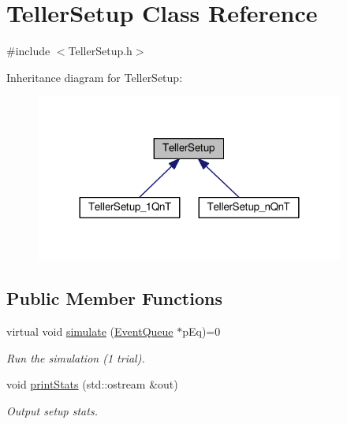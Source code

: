 \hypertarget{class_teller_setup}{}\section{Teller\+Setup Class Reference}
\label{class_teller_setup}


{\ttfamily \#include $<$Teller\+Setup.\+h$>$}



Inheritance diagram for Teller\+Setup\+:
\nopagebreak
\begin{figure}[H]
\begin{center}
\leavevmode
\includegraphics[width=288pt]{class_teller_setup__inherit__graph}
\end{center}
\end{figure}
\subsection*{Public Member Functions}
\begin{DoxyCompactItemize}
\item 
virtual void \hyperlink{class_teller_setup_a2050cd6f277e76cd662b68cf33396034}{simulate} (\hyperlink{class_event_queue}{Event\+Queue} $\ast$p\+Eq)=0
\begin{DoxyCompactList}\small\item\em Run the simulation (1 trial). \end{DoxyCompactList}\item 
void \hyperlink{class_teller_setup_a0a95ca183af3f059b3a78d418f6ce840}{print\+Stats} (std\+::ostream \&out)
\begin{DoxyCompactList}\small\item\em Output setup stats. \end{DoxyCompactList}\end{DoxyCompactItemize}
